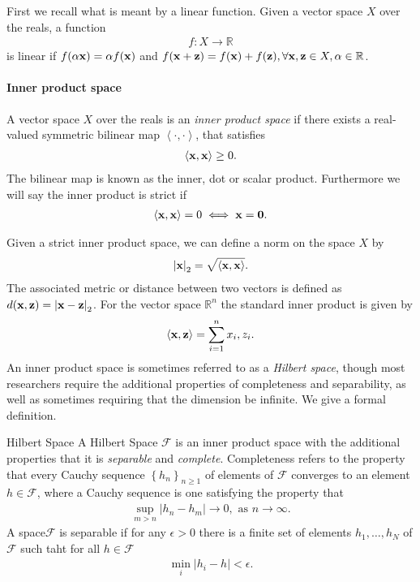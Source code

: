 First we recall what is meant by a linear function. Given a vector space $X$ over the reals, a function
\begin{align*}
	f: X\longrightarrow \mathbb{R}
\end{align*}
is linear if $f(\alpha{\mathbf{x}}) = \alpha f({\mathbf{x}})$ and $f({\mathbf{x}}+{\mathbf{z}}) = f({\mathbf{x}})+ f({\mathbf{z}}), \forall {\mathbf{x}},{\mathbf{z}} \in X, \alpha\in \mathbb{R}$. 

\paragraph{Inner product space} A vector space $X$ over the reals  is an \textit{inner product space} if there exists a real-valued symmetric bilinear map $\left<\cdot, \cdot\right>$, that satisfies
\begin{align*}
	\left<{\mathbf{x}},{\mathbf{x}}\right>\geq 0.
\end{align*}
The bilinear map is known as the inner, dot or scalar product. Furthermore we will say the inner product is strict if 
\begin{align*}
	\left<{\mathbf{x}}, {\mathbf{x}}\right>=0 \iff {\mathbf{x}}=\mathbf{0}.
\end{align*}

Given a strict inner product space, we can define a norm on the space $X$ by 
\begin{align*}
	\left|{\mathbf{x}}\right|_2=\sqrt{\left<{\mathbf{x}}, {\mathbf{x}}\right>}.
\end{align*}
The associated metric or distance between two vectors is defined as $d({\mathbf{x}}, {\mathbf{z}}) = \left|{\mathbf{x}}-{\mathbf{z}}\right|_2$. For the vector space $\mathbb{R}^n$ the standard inner product is given by 
\begin{align*}
	\left<{\mathbf{x}}, {\mathbf{z}}\right> = \sum_{i=1}^n x_i,z_i.
\end{align*}
An inner product space is sometimes referred to as a \textit{Hilbert space}, though most researchers require the additional properties of completeness and separability, as well as sometimes requiring that the dimension be infinite. We give a formal definition.

\begin{Definition}{Hilbert Space}
	A Hilbert Space $\mathcal{F}$ is an inner product space with the additional properties that it is \textit{separable} and \textit{complete}. Completeness refers to the property that every Cauchy sequence $\left\{h_n\right\}_{n\geq 1}$ of elements of $\mathcal{F}$ converges to an element $h\in \mathcal{F}$, where a Cauchy sequence is one satisfying the property that 
	\begin{align*}
		\sup_{m>n}\left|h_n-h_m\right|\to 0, \text{ as } n\to \infty.
	\end{align*}
	A space$\mathcal{F}$ is separable if for any $\epsilon>0$ there is a finite set of elements $h_1,\dots, h_N$ of $\mathcal{F}$ such taht for all $h\in \mathcal{F}$
	\begin{align*}
		\min_i \left|h_i-h\right|<\epsilon.
	\end{align*}
\end{Definition}

